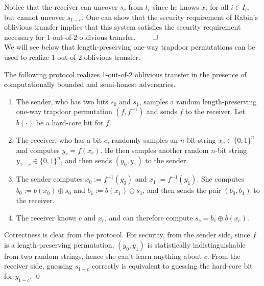 Notice that the receiver can uncover $s_c$ from $t_c$ since he knows $x_i$ for all $i \in I_c$, but cannot uncover $s_{1-c}$. One can show that the security requirement of Rabin's oblivious transfer implies that this system satisfies the security requirement necessary for 1-out-of-2 oblivious transfer. $\qed$ \\

We will see below that length-preserving one-way trapdoor permutations can be used to realize 1-out-of-2 oblivious transfer. 

\begin{theorem}
The following protocol realizes 1-out-of-2 oblivious transfer in the presence of computationally bounded and semi-honest adversaries. 
\begin{enumerate}
\item The sender, who has two bits $s_0$ and $s_1$, samples a random length-preserving one-way trapdoor permutation $(f, f^{-1})$ and sends $f$ to the receiver.  Let $b(\cdot)$ be a hard-core bit for $f$.
\item The receiver, who has a bit $c$, randomly samples an $n$-bit string $x_c \in \{0,1\}^n$ and computes $y_c = f(x_c)$. He then samples another random $n$-bit string $y_{1-c} \in \{0,1\}^n$, and then sends $(y_0, y_1)$ to the sender.
\item The sender computes $x_0 := f^{-1}(y_0)$ and $x_1 := f^{-1}(y_1)$. She computes $b_0 := b(x_0) \oplus s_0$ and $b_1 := b(x_1) \oplus s_1$, and then sends the pair $(b_0, b_1)$ to the receiver.
\item The receiver knows $c$ and $x_c$, and can therefore compute $s_c = b_c \oplus b(x_c)$. 
\end{enumerate}
\end{theorem}
\proof
Correctness is clear from the protocol.	
For security, from the sender side, since $f$ is a length-preserving permutation, $(y_0, y_1)$ is statistically indistinguishable from two random strings, hence she can't learn anything about $c$.
From the receiver side, guessing $s_{1-c}$ correctly is equivalent to guessing the hard-core bit for $y_{1-c}$.
\qed


